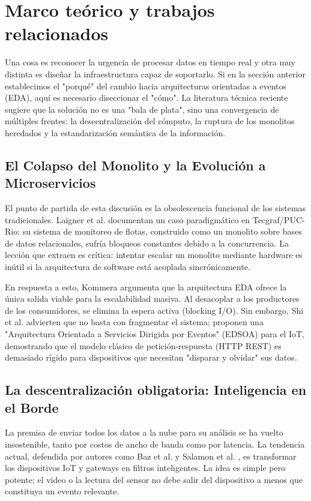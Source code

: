 \section{Marco teórico y trabajos relacionados}

Una cosa es reconocer la urgencia de procesar datos en tiempo real y otra muy distinta es diseñar la infraestructura capaz de soportarlo. Si en la sección anterior establecimos el "porqué" del cambio hacia arquitecturas orientadas a eventos (EDA), aquí es necesario diseccionar el "cómo". La literatura técnica reciente sugiere que la solución no es una "bala de plata", sino una convergencia de múltiples frentes: la descentralización del cómputo, la ruptura de los monolitos heredados y la estandarización semántica de la información.

\subsection{El Colapso del Monolito y la Evolución a Microservicios}
El punto de partida de esta discusión es la obsolescencia funcional de los sistemas tradicionales. Laigner et al. \cite{laigner2020monolithic} documentan un caso paradigmático en Tecgraf/PUC-Rio: su sistema de monitoreo de flotas, construido como un monolito sobre bases de datos relacionales, sufría bloqueos constantes debido a la concurrencia. La lección que extraen es crítica: intentar escalar un monolito mediante hardware es inútil si la arquitectura de software está acoplada sincrónicamente.

En respuesta a esto, Kommera \cite{kommera2020power} argumenta que la arquitectura EDA ofrece la única salida viable para la escalabilidad masiva. Al desacoplar a los productores de los consumidores, se elimina la espera activa (blocking I/O). Sin embargo, Shi et al. \cite{shi2015execution} advierten que no basta con fragmentar el sistema; proponen una "Arquitectura Orientada a Servicios Dirigida por Eventos" (EDSOA) para el IoT, demostrando que el modelo clásico de petición-respuesta (HTTP REST) es demasiado rígido para dispositivos que necesitan "disparar y olvidar" sus datos.

\subsection{La descentralización obligatoria: Inteligencia en el Borde}
La premisa de enviar todos los datos a la nube para su análisis se ha vuelto insostenible, tanto por costos de ancho de banda como por latencia. La tendencia actual, defendida por autores como Baz et al. \cite{baz2019video} y Salamon et al. \cite{salamon2018gateway}, es transformar los dispositivos IoT y gateways en filtros inteligentes. La idea es simple pero potente: el video o la lectura del sensor no debe salir del dispositivo a menos que constituya un evento relevante.

